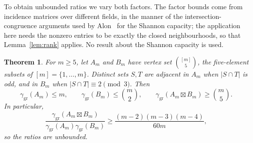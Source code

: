 \documentclass[11pt,a4paper,reqno]{amsart}
\newtheorem{theorem}{Theorem}[section]
\theoremstyle{definition}
\theoremstyle{remark}
\numberwithin{equation}{section}
\newcommand{\ggr}{\gamma_{\mathrm{gr}}}
\newcommand{\sprod}{\boxtimes}
\begin{document}
To obtain unbounded ratios we vary both factors. The factor bounds come from incidence matrices over different fields, in the manner of the intersection-congruence arguments used by Alon~\cite[Section~3]{Alon} for the Shannon capacity; the application here needs the nonzero entries to be exactly the closed neighbourhoods, so that Lemma~\ref{lem:rank} applies. No result about the Shannon capacity is used.

\begin{theorem}\label{thm:two-fields}
For $m\ge5$, let $A_m$ and $B_m$ have vertex set $\binom{[m]}5$, the five-element subsets of $[m]=\{1,\dots,m\}$. Distinct sets $S,T$ are adjacent in $A_m$ when $|S\cap T|$ is odd, and in $B_m$ when $|S\cap T|\equiv2\pmod3$. Then
\[
 \ggr(A_m)\le m,\qquad \ggr(B_m)\le\binom m2,\qquad
 \ggr(A_m\sprod B_m)\ge\binom m5.
\]
In particular,
\begin{equation}\label{eq:unbounded-ratio}
 \frac{\ggr(A_m\sprod B_m)}{\ggr(A_m)\ggr(B_m)}
 \ge\frac{(m-2)(m-3)(m-4)}{60m},
\end{equation}
so the ratios are unbounded.
\end{theorem}
\end{document}
